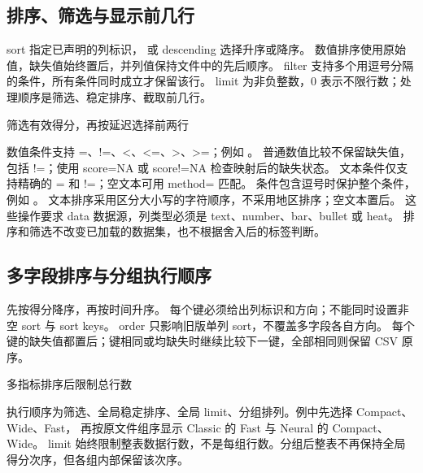 \subsection{排序、筛选与显示前几行}
sort 指定已声明的列标识， 或 descending 选择升序或降序。
数值排序使用原始值，缺失值始终置后，并列值保持文件中的先后顺序。
filter 支持多个用逗号分隔的条件，所有条件同时成立才保留该行。
limit 为非负整数，0 表示不限行数；处理顺序是筛选、稳定排序、截取前几行。
\begin{example}[text and listing,sidebyside=false]{筛选有效得分，再按延迟选择前两行}
\begin{gradtable}[data=results,width=\linewidth,scale=column,
  filter={score>=75},sort=time,order=ascending,limit=2,header align=c]
\end{gradtable}
\end{example}
数值条件支持 =、!=、<、<=、>、>=；例如 。
普通数值比较不保留缺失值，包括 !=；使用 score=NA 或 score!=NA 检查映射后的缺失状态。
文本条件仅支持精确的 = 和 !=；空文本可用 method= 匹配。
条件包含逗号时保护整个条件，例如 。
文本排序采用区分大小写的字符顺序，不采用地区排序；空文本置后。
这些操作要求 data 数据源，列类型必须是 text、number、bar、bullet 或 heat。
排序和筛选不改变已加载的数据集，也不根据舍入后的标签判断。

\subsection{多字段排序与分组执行顺序}
 先按得分降序，再按时间升序。
每个键必须给出列标识和方向；不能同时设置非空 sort 与 sort keys。
order 只影响旧版单列 sort，不覆盖多字段各自方向。
每个键的缺失值都置后；键相同或均缺失时继续比较下一键，全部相同则保留 CSV 原序。
\begin{example}[text and listing,sidebyside=false]{多指标排序后限制总行数}
\begin{gradtable}[data=families,width=\linewidth,
  sort keys={score/descending,time/ascending},limit=3,group by=family,header align=c]
\end{gradtable}
\end{example}
执行顺序为筛选、全局稳定排序、全局 limit、分组排列。例中先选择 Compact、Wide、Fast，
再按原文件组序显示 Classic 的 Fast 与 Neural 的 Compact、Wide。
limit 始终限制整表数据行数，不是每组行数。分组后整表不再保持全局得分次序，但各组内部保留该次序。

